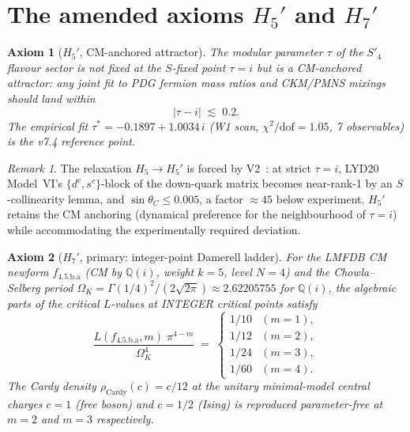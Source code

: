 \documentclass[a4paper,11pt]{article}
\newcommand{\Spf}{S'_4}
\newcommand{\OmK}{\Omega_K}
\newcommand{\fLM}{f_{\text{4.5.b.a}}}
\newcommand{\Qi}{\mathbb{Q}(i)}
\newtheorem*{axiom*}{Axiom}
\theoremstyle{definition}
\theoremstyle{remark}
\newtheorem{remark}[theorem]{Remark}
\begin{document}
\section{The amended axioms $H_5'$ and $H_7'$}
\label{sec:amended}

\begin{axiom*}[$H_5'$, CM-anchored attractor]
The modular parameter $\tau$ of the $\Spf$ flavour sector is not
fixed at the $S$-fixed point $\tau=i$ but is a \emph{CM-anchored
attractor}: any joint fit to PDG fermion mass ratios and CKM/PMNS
mixings should land within
\[
  |\tau - i| \;\lesssim\; 0.2.
\]
The empirical fit $\tau^{*}=-0.1897+1.0034\,i$ (W1 scan,
$\chi^{2}/\mathrm{dof}=1.05$, 7 observables) is the v7.4 reference
point.
\end{axiom*}

\begin{remark}
The relaxation $H_5\to H_5'$ is forced by V2~\cite{V2NoGo}: at strict
$\tau=i$, LYD20 Model~VI's $\{d^{c},s^{c}\}$-block of the down-quark
matrix becomes near-rank-1 by an $S$-collinearity lemma, and
$\sin\theta_C\le 0.005$, a factor $\approx 45$ below experiment.
$H_5'$ retains the CM anchoring (dynamical preference for the
neighbourhood of $\tau=i$) while accommodating the experimentally
required deviation.
\end{remark}

\begin{axiom*}[$H_7'$, primary: integer-point Damerell ladder]
For the LMFDB CM newform $\fLM$ (CM by $\Qi$, weight $k=5$, level
$N=4$) and the Chowla--Selberg period
$\OmK = \Gamma(1/4)^{2}/(2\sqrt{2\pi})\approx 2.62205755$ for $\Qi$,
the algebraic parts of the critical $L$-values at INTEGER critical
points satisfy
\begin{equation}
\label{eq:ladder}
  \frac{L(\fLM,m)\;\pi^{4-m}}{\OmK^{4}}
  \;=\;
  \begin{cases}
    1/10  & (m=1),\\
    1/12  & (m=2),\\
    1/24  & (m=3),\\
    1/60  & (m=4).
  \end{cases}
\end{equation}
The Cardy density $\rho_{\mathrm{Cardy}}(c)=c/12$ at the unitary
minimal-model central charges $c=1$ (free boson) and $c=1/2$
(Ising) is reproduced \emph{parameter-free} at $m=2$ and $m=3$
respectively.
\end{axiom*}
\end{document}
